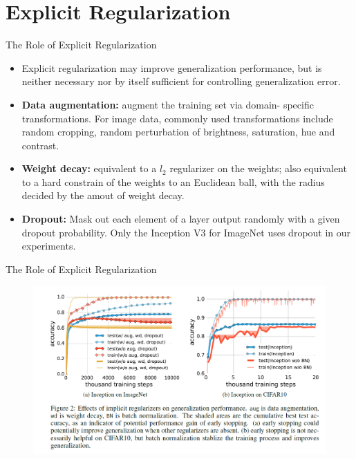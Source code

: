 \documentclass[mathserif]{beamer}
\begin{document}
\section{Explicit Regularization}
\begin{frame}[t]{The Role of Explicit Regularization}
\begin{itemize}
  \item Explicit regularization may improve generalization performance,
  but is neither necessary nor by itself sufficient for controlling
  generalization error.
  \item \textbf{Data augmentation: }augment the training set via domain-
  specific transformations. For image data, commonly used transformations
  include random cropping, random perturbation of brightness, saturation,
  hue and contrast.
  \item \textbf{Weight decay: }equivalent to a $l_{2}$ regularizer on the
  weights; also equivalent to a hard constrain of the weights to an
  Euclidean ball, with the radius decided by the amout of weight decay.
  \item \textbf{Dropout: }Mask out each element of a layer output randomly
  with a given dropout probability. Only the Inception V3 for ImageNet uses
  dropout in our experiments.
\end{itemize}
\end{frame}

\begin{frame}[t]{The Role of Explicit Regularization}
  \begin{figure}
    \centering
    \includegraphics[scale=0.5]{fig/2}
  \end{figure}
\end{frame}
\end{document}

